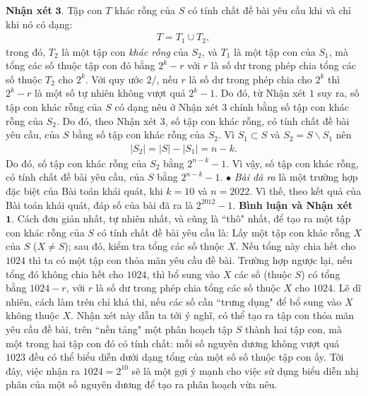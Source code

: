 \begin{multicols}{2}
	\vskip 0.05cm
	\textbf{\color{thachthuctoanhoc}Nhận xét} $\pmb{3.}$ Tập con $T$ khác rỗng của $S$ có tính chất đề bài yêu cầu khi và chỉ khi nó có dạng:
	\begin{align*}
		T = {T_1} \cup {T_2},
	\end{align*}
	trong đó, $T_2$ là một tập con \textit{khác rỗng} của $S_2$, và $T_1$ là một tập con của  $S_1$, mà tổng các số thuộc tập con đó bằng  $2^k -r$ với $r$ là số dư trong phép chia tổng các số thuộc $T_2$  cho  $2^k$.
	\vskip 0.05cm
	Với quy ước $2/$, nếu $r$ là số dư trong phép chia cho $2^k$  thì $2^k -r$ là một số tự nhiên không vượt quá  $2^k -1$. Do đó, từ Nhận xét $1$ suy ra, số tập con khác rỗng của $S$ có dạng nêu ở Nhận xét $3$ chính bằng số tập con khác rỗng của $S_2$. Do đó, theo Nhận xét $3$, số tập con khác rỗng, có tính chất đề bài yêu cầu, của $S$ bằng số tập con khác rỗng của  $S_2$.
	\vskip 0.05cm
	Vì ${S_1} \subset S$  và  ${S_2} = S \backslash S_1$ nên
	\begin{align*}
		\left| {{S_2}} \right| = \left| S \right| - \left| {{S_1}} \right| = n - k.
	\end{align*}
	Do đó, số tập con khác rỗng của  $S_2$ bằng  ${2^{n - k}} - 1$.
	\vskip 0.05cm 
	Vì vậy, số tập con khác rỗng, có tính chất đề bài yêu cầu, của $S$ bằng ${2^{n - k}} - 1$.
	\vskip 0.05cm 
	$\bullet$ \textit{Bài đã ra} là một trường hợp đặc biệt của Bài toán khái quát, khi $k = 10$ và $n = 2022$. Vì thế, theo kết quả của Bài toán khái quát, đáp số của bài đã ra là $2^{2012} -1$.
	\vskip 0.05cm 
	\textbf{\color{thachthuctoanhoc}Bình luận và Nhận xét}
	\vskip 0.05cm
	$\pmb{1.}$ Cách đơn giản nhất, tự nhiên nhất, và cũng là ``thô" nhất, để tạo ra một tập con khác rỗng của $S$ có tính chất đề bài yêu cầu là: Lấy một tập con khác rỗng $X$ của $S$ ($X \ne S$); sau đó, kiểm tra tổng các số thuộc $X$. Nếu tổng này chia hết cho $1024$ thì ta có một tập con thỏa mãn yêu cầu đề bài. Trường hợp ngược lại, nếu tổng đó không chia hết cho $1024$, thì bổ sung vào $X$ các số (thuộc $S$) có tổng bằng $1024 - r$, với $r$ là số dư trong phép chia tổng các số thuộc $X$ cho $1024$.
	\vskip 0.05cm
	Lẽ dĩ nhiên, cách làm trên chỉ khả thi, nếu các số cần ``trưng dụng" để bổ sung vào $X$ không thuộc $X$. Nhận xét này dẫn ta tới ý nghĩ, có thể tạo ra tập con thỏa mãn yêu cầu đề bài, trên ``nền tảng" một phân hoạch tập $S$ thành hai tập con, mà một trong hai tập con đó có tính chất: mỗi số nguyên dương không vượt quá $1023$ đều có thể biểu diễn dưới dạng tổng của một số số thuộc tập con ấy. Tới đây, việc nhận ra  $1024 = 2^{10}$ sẽ là một gợi ý mạnh cho việc sử dụng biểu diễn nhị phân của một số nguyên dương để tạo ra phân hoạch vừa nêu.

\end{multicols}
